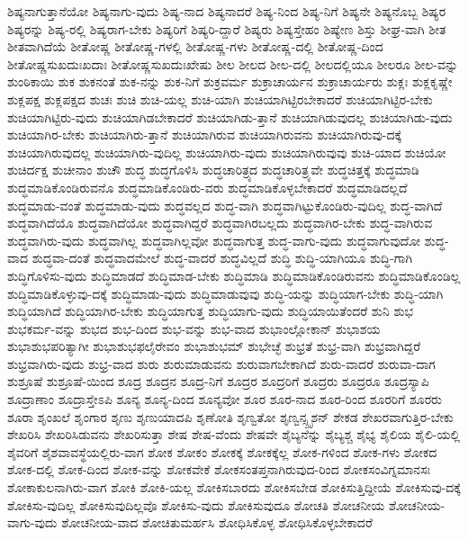 {ಶಿಷ್ಯನಾಗುತ್ತಾನೆಯೋ
ಶಿಷ್ಯನಾಗು-ವುದು
ಶಿಷ್ಯ-ನಾದ
ಶಿಷ್ಯನಾದರೆ
ಶಿಷ್ಯ-ನಿಂದ
ಶಿಷ್ಯ-ನಿಗೆ
ಶಿಷ್ಯನೇ
ಶಿಷ್ಯನೊಬ್ಬ
ಶಿಷ್ಯರ
ಶಿಷ್ಯರನ್ನು
ಶಿಷ್ಯ-ರಲ್ಲಿ
ಶಿಷ್ಯರಾಗ-ಬೇಕು
ಶಿಷ್ಯರಿಗೆ
ಶಿಷ್ಯರಿ-ದ್ದಾರೆ
ಶಿಷ್ಯರು
ಶಿಷ್ಯಸ್ತೇಹಂ
ಶಿಷ್ಯೇಣ
ಶಿಸ್ತು
ಶೀಘ್ರ-ವಾಗಿ
ಶೀತ
ಶೀತವಾಗಿದೆಯೆ
ಶೀತೋಷ್ಣ
ಶೀತೋಷ್ಣ-ಗಳಲ್ಲಿ
ಶೀತೋಷ್ಣ-ಗಳು
ಶೀತೋಷ್ಣ-ದಲ್ಲಿ
ಶೀತೋಷ್ಣ-ದಿಂದ
ಶೀತೋಷ್ಣಸುಖದುಃಖದಾಃ
ಶೀತೋಷ್ಣಸುಖದುಃಖೇಷು
ಶೀಲ
ಶೀಲದ
ಶೀಲ-ದಲ್ಲಿ
ಶೀಲದಲ್ಲಿಯೂ
ಶೀಲರೂ
ಶೀಲ-ವನ್ನು
ಶುಂಠಿಕಾಯಿ
ಶುಕ
ಶುಕನಂತೆ
ಶುಕ-ನನ್ನು
ಶುಕ-ನಿಗೆ
ಶುಕ್ರವರ್ಮ
ಶುಕ್ರಾಚಾರ್ಯನ
ಶುಕ್ರಾಚಾರ್ಯರು
ಶುಕ್ಲಃ
ಶುಕ್ಲಕೃಷ್ಣೇ
ಶುಕ್ಲಪಕ್ಷ
ಶುಕ್ಲಪಕ್ಷದ
ಶುಚಃ
ಶುಚಿ
ಶುಚಿ-ಯಲ್ಲ
ಶುಚಿ-ಯಾಗಿ
ಶುಚಿಯಾಗಿಟ್ಟಿರಬೇಕಾದರೆ
ಶುಚಿಯಾಗಿಟ್ಟಿರ-ಬೇಕು
ಶುಚಿಯಾಗಿಟ್ಟಿರು-ವುದು
ಶುಚಿಯಾಗಿಡಬೇಕಾದರೆ
ಶುಚಿಯಾಗಿಡು-ತ್ತಾನೆ
ಶುಚಿಯಾಗಿಡುವುದಲ್ಲ
ಶುಚಿಯಾಗಿಡು-ವುದು
ಶುಚಿಯಾಗಿರ-ಬೇಕು
ಶುಚಿಯಾಗಿರು-ತ್ತಾನೆ
ಶುಚಿಯಾಗಿರುವ
ಶುಚಿಯಾಗಿರುವನು
ಶುಚಿಯಾಗಿರುವು-ದಕ್ಕೆ
ಶುಚಿಯಾಗಿರುವುದಲ್ಲ
ಶುಚಿಯಾಗಿರು-ವುದಿಲ್ಲ
ಶುಚಿಯಾಗಿರು-ವುದು
ಶುಚಿಯಾಗಿರುವುವು
ಶುಚಿ-ಯಾದ
ಶುಚಿಯೋ
ಶುಚಿರ್ದಕ್ಷ
ಶುಚೀನಾಂ
ಶುಚೌ
ಶುದ್ಧ
ಶುದ್ಧಗೊಳಿಸಿ
ಶುದ್ಧಚಾರಿತ್ರ್ಯದ
ಶುದ್ಧಚಾರಿತ್ರ್ಯವೇ
ಶುದ್ಧಚಿತ್ತಕ್ಕೆ
ಶುದ್ಧಮಾಡಿ
ಶುದ್ಧಮಾಡಿಕೊಂಡಿರುವನೊ
ಶುದ್ಧಮಾಡಿಕೊಂಡಿರು-ವರು
ಶುದ್ಧಮಾಡಿಕೊಳ್ಳಬೇಕಾದರೆ
ಶುದ್ಧಮಾಡಿದಲ್ಲದೆ
ಶುದ್ಧಮಾಡು-ವಂತೆ
ಶುದ್ಧಮಾಡು-ವುದು
ಶುದ್ಧವಲ್ಲದ
ಶುದ್ಧ-ವಾಗಿ
ಶುದ್ಧವಾಗಿಟ್ಟುಕೊಂಡಿರು-ವುದಿಲ್ಲ
ಶುದ್ಧ-ವಾಗಿದೆ
ಶುದ್ಧವಾಗಿದೆಯೊ
ಶುದ್ಧವಾಗಿದೆಯೋ
ಶುದ್ಧವಾಗಿದ್ದರೆ
ಶುದ್ಧವಾಗಿರಬಲ್ಲದು
ಶುದ್ಧವಾಗಿರ-ಬೇಕು
ಶುದ್ಧ-ವಾಗಿರುವ
ಶುದ್ಧವಾಗಿರು-ವುದು
ಶುದ್ಧವಾಗಿಲ್ಲ
ಶುದ್ಧವಾಗಿಲ್ಲವೋ
ಶುದ್ಧವಾಗುತ್ತ
ಶುದ್ಧ-ವಾಗು-ವುದು
ಶುದ್ಧವಾಗುವುದೋ
ಶುದ್ಧ-ವಾದ
ಶುದ್ಧವಾ-ದಂತೆ
ಶುದ್ಧವಾದಮೇಲೆ
ಶುದ್ಧ-ವಾದರೆ
ಶುದ್ಧವಿಲ್ಲದೆ
ಶುದ್ಧಿ
ಶುದ್ಧಿ-ಯಾಗಿಯೂ
ಶುದ್ಧಿ-ಗಾಗಿ
ಶುದ್ಧಿಗೊಳಿಸು-ವುದು
ಶುದ್ಧಿಮಾಡದೆ
ಶುದ್ಧಿಮಾಡ-ಬೇಕು
ಶುದ್ಧಿಮಾಡಿ
ಶುದ್ಧಿಮಾಡಿಕೊಂಡಿರುವನು
ಶುದ್ಧಿಮಾಡಿಕೊಂಡಿಲ್ಲ
ಶುದ್ಧಿಮಾಡಿಕೊಳ್ಳುವು-ದಕ್ಕೆ
ಶುದ್ಧಿಮಾಡು-ವುದು
ಶುದ್ಧಿಮಾಡುವುವು
ಶುದ್ಧಿ-ಯನ್ನು
ಶುದ್ಧಿಯಾಗ-ಬೇಕು
ಶುದ್ಧಿ-ಯಾಗಿ
ಶುದ್ಧಿಯಾಗಿದೆ
ಶುದ್ಧಿಯಾಗಿರ-ಬೇಕು
ಶುದ್ಧಿಯಾಗುತ್ತ
ಶುದ್ಧಿಯಾಗು-ವುದು
ಶುದ್ಧಿಯಾಯಿತೆಂದರೆ
ಶುನಿ
ಶುಭ
ಶುಭಕರ್ಮ-ವನ್ನು
ಶುಭದ
ಶುಭ-ದಿಂದ
ಶುಭ-ವನ್ನು
ಶುಭ-ವಾದ
ಶುಭಾಂಲ್ಲೋಕಾನ್
ಶುಭಾಶಯ
ಶುಭಾಶುಭಪರಿತ್ಯಾಗೀ
ಶುಭಾಶುಭಫಲೈರೇವಂ
ಶುಭಾಶುಭಮ್
ಶುಭೇಚ್ಛೆ
ಶುಭ್ರತೆ
ಶುಭ್ರ-ವಾಗಿ
ಶುಭ್ರವಾಗಿದ್ದರೆ
ಶುಭ್ರವಾಗಿರು-ವುದು
ಶುಭ್ರ-ವಾದ
ಶುರು
ಶುರುಮಾಡುವನು
ಶುರುವಾಗಬೇಕಾಗಿದೆ
ಶುರು-ವಾದರೆ
ಶುರುವಾ-ದಾಗ
ಶುಶ್ರೂಷೆ
ಶುಶ್ರೂಷೆ-ಯಿಂದ
ಶೂದ್ರ
ಶೂದ್ರನ
ಶೂದ್ರ-ನಿಗೆ
ಶೂದ್ರರ
ಶೂದ್ರರಿಗೆ
ಶೂದ್ರರು
ಶೂದ್ರರೂ
ಶೂದ್ರಸ್ಯಾಪಿ
ಶೂದ್ರಾಣಾಂ
ಶೂದ್ರಾಸ್ತೇಽಪಿ
ಶೂನ್ಯ
ಶೂನ್ಯ-ದಿಂದ
ಶೂನ್ಯವೋ
ಶೂರ
ಶೂರ-ನಾದ
ಶೂರ-ರಿಂದ
ಶೂರರಿಗೆ
ಶೂರರು
ಶೂರಾ
ಶೃಂಖಲೆ
ಶೃಂಗಾರ
ಶೃಣು
ಶೃಣುಯಾದಪಿ
ಶೃಣೋತಿ
ಶೃಣ್ವತೋ
ಶೃಣ್ವನ್ಸ್ಪೃಶನ್
ಶೇಕಡ
ಶೇಖರವಾಗುತ್ತಿರ-ಬೇಕು
ಶೇಖರಿಸಿ
ಶೇಖರಿಸಿಡುವನು
ಶೇಖರಿಸುತ್ತಾ
ಶೇಷ
ಶೇಷ-ವೆಂದು
ಶೇಷವೇ
ಶೈಬ್ಯನೆನ್ನು
ಶೈಬ್ಯಶ್ಚ
ಶೈಭ್ಯ
ಶೈಲಿಯ
ಶೈಲಿ-ಯಲ್ಲಿ
ಶೈವರಿಗೆ
ಶೈಶವಾವಸ್ಥೆಯಲ್ಲಿರು-ವಾಗ
ಶೋಕ
ಶೋಕಂ
ಶೋಕಕ್ಕೆ
ಶೋಕಕ್ಕೆಲ್ಲ
ಶೋಕ-ಗಳಿಂದ
ಶೋಕ-ಗಳು
ಶೋಕದ
ಶೋಕ-ದಲ್ಲಿ
ಶೋಕ-ದಿಂದ
ಶೋಕ-ವನ್ನು
ಶೋಕವೇಕೆ
ಶೋಕಸಂತಪ್ತನಾಗಿರುವುದ-ರಿಂದ
ಶೋಕಸಂವಿಗ್ನಮಾನಸಃ
ಶೋಕಾಕುಲನಾಗಿರು-ವಾಗ
ಶೋಕಿ
ಶೋಕಿ-ಯಲ್ಲ
ಶೋಕಿಸಬಾರದು
ಶೋಕಿಸಬೇಡ
ಶೋಕಿಸುತ್ತಿದ್ದೀಯೆ
ಶೋಕಿಸುವು-ದಕ್ಕೆ
ಶೋಕಿಸು-ವುದಿಲ್ಲ
ಶೋಕಿಸುವುದಿಲ್ಲವೊ
ಶೋಕಿಸು-ವುದು
ಶೋಕಿಸುವುದೂ
ಶೋಚತಿ
ಶೋಚನೀಯ
ಶೋಚನೀಯ-ವಾಗು-ವುದು
ಶೋಚನೀಯ-ವಾದ
ಶೋಚಿತುಮರ್ಹಸಿ
ಶೋಧಿಸಿಕೊಳ್ಳ
ಶೋಧಿಸಿಕೊಳ್ಳಬೇಕಾದರೆ
}
